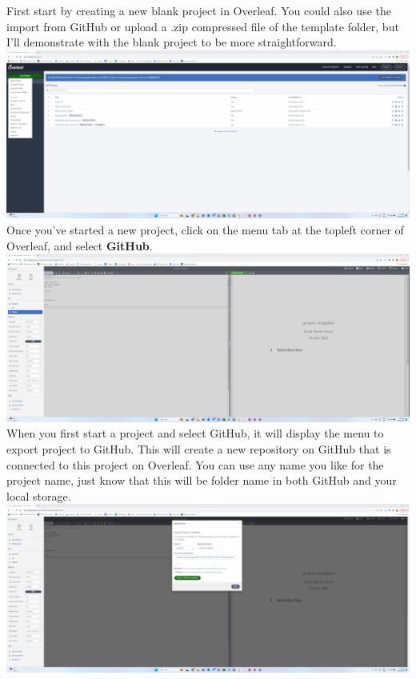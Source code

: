 \documentclass[12pt]{article}
\begin{document}
First start by creating a new blank project in Overleaf. 
You could also use the import from GitHub or upload a .zip compressed file of the template folder, but I'll demonstrate with the blank project to be more straightforward. \\


\includegraphics[width=1\textwidth]{Instructions/project_template_screenshots/project_template_01.png} \\

Once you've started a new project, click on the menu tab at the topleft corner of Overleaf, and select \textbf{GitHub}. \\

\includegraphics[width=1\textwidth]{Instructions/project_template_screenshots/project_template_02.png} \\

When you first start a project and select GitHub, it will display the menu to export project to GitHub. This will create a new repository on GitHub that is connected to this project on Overleaf. You can use any name you like for the project name, just know that this will be folder name in both GitHub and your local storage. \\

\includegraphics[width=1\textwidth]{Instructions/project_template_screenshots/project_template_03.png}\\
\end{document}
